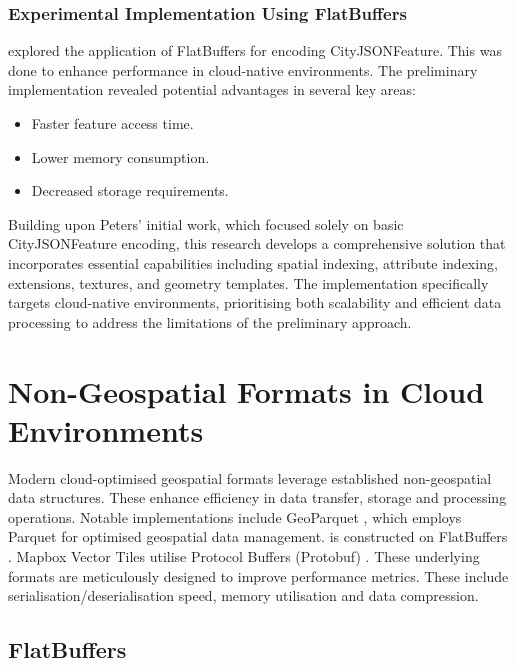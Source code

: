 \subsubsection{Experimental Implementation Using FlatBuffers}
\label{rw:cityjson_enhancements:performance:flatbuffers}

\citet{ravi_peters_2024_citybuf} explored the application of FlatBuffers \citep{flatbuffers} for encoding CityJSONFeature.
This was done to enhance performance in cloud-native environments.
The preliminary implementation revealed potential advantages in several key areas:

\begin{itemize}
  \item Faster feature access time.
  \item Lower memory consumption.
  \item Decreased storage requirements.
\end{itemize}

Building upon Peters' initial work, which focused solely on basic CityJSONFeature encoding, this research develops a comprehensive solution that incorporates essential capabilities including spatial indexing, attribute indexing, extensions, textures, and geometry templates. The implementation specifically targets cloud-native environments, prioritising both scalability and efficient data processing to address the limitations of the preliminary approach.

\section{Non-Geospatial Formats in Cloud Environments}
\label{rw:non_geospatial_formats}

Modern cloud-optimised geospatial formats leverage established non-geospatial data structures.
These enhance efficiency in data transfer, storage and processing operations.
Notable implementations include GeoParquet \citep{geoparquet}, which employs Parquet \citep{parquet} for optimised geospatial data management.
\citet{flatgeobuf} is constructed on FlatBuffers \citep{flatbuffers}. Mapbox Vector Tiles \citep{mapbox-vector-tiles} utilise Protocol Buffers (Protobuf) \citep{protobuf}.
These underlying formats are meticulously designed to improve performance metrics.
These include serialisation/deserialisation speed, memory utilisation and data compression.

\subsection{FlatBuffers}
\label{rw:non_geospatial_formats:flatbuffers}

